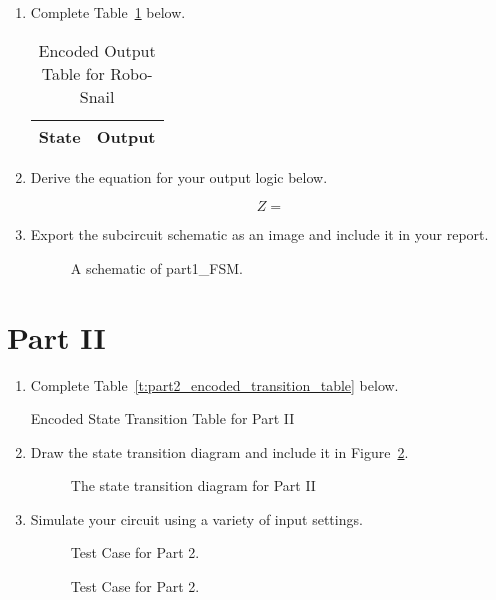 \documentclass{article}
\begin{document}
\begin{enumerate}
\item Complete Table~\ref{t:part1_output_table} below.

\begin{table}[ht!]
\caption{Encoded Output Table for Robo-Snail}
\label{t:part1_output_table}
\centering
\begin{tabular}{|l|l|}
\hline
State   & Output \\ \hline
\end{tabular}
\end{table}

\item Derive the equation for your output logic below.

$$Z = $$

\item Export the subcircuit schematic as an image and include it in your report.

\begin{figure}[ht!]
    \centering
    \caption{A schematic of part1\_FSM.}
    \label{f:part1_FSM}
\end{figure}
\end{enumerate}

\clearpage
\section{Part II}

\begin{enumerate}
\item Complete Table~\ref{t:part2_encoded_transition_table} below.

\begin{table}[ht!]
\caption{Encoded State Transition Table for Part II}
\label{t:part2_encoded_transition_table}
\centering
\end{table}


\item Draw the state transition diagram and include it in Figure~\ref{f:part2_state_diagram}.

\begin{figure}[ht!]
    \centering
    \caption{The state transition diagram for Part II}
    \label{f:part2_state_diagram}
\end{figure}



    \item Simulate your circuit using a variety of input settings.
        
    \begin{figure}[ht!]
    \centering
    \caption{Test Case for Part 2.}
    \label{f:part2_testcase 1}
\end{figure}
    \begin{figure}[ht!]
    \centering
    \caption{Test Case for Part 2.}
    \label{f:part2_testcase 2}
\end{figure}

\end{enumerate}
\end{document}
